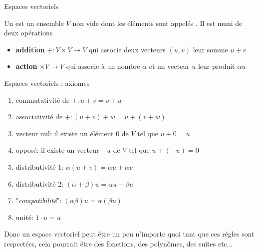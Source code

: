 \begin{parag}{Espaces vectoriels}
    \begin{definition}
        Un  est un ensemble $V$ non vide dont les éléments sont appelés . Il est muni de deux opérations
        \begin{itemize}
            \item \textbf{addition} $+ : V \times V \to V$ qui associe deux vecteurs $(u, v)$ leur somme $u + v$
            \item \textbf{action} \R$ \times V \to V$ qui associe à un nombre $\alpha$ et un vecteur $u$ leur produit $\alpha u$
        \end{itemize}
    \end{definition}
    \begin{subparag}{Espaces vectoriels : axiomes}
        \begin{enumerate}
            \item commutativité de $+ : u + v = v + u$
            \item associativité de $+ : (u+v) + w = u + (v + w)$
            \item vecteur nul: il existe un élément $0$ de $V$ tel que $u  +0 = u$
            \item opposé: il existe un vecteur $-u$ de $V$ tel que $u + (-u) = 0$
            \item distributivité 1: $\alpha(u + v) = \alpha u + \alpha v$
            \item distributivité 2: $(\alpha + \beta) u = \alpha u + \beta u$
            \item "\textit{compatibilité}": $(\alpha\beta)u = \alpha(\beta u)$
            \item unité: $1 \cdot u = u$
        \end{enumerate}
    \end{subparag}
    \begin{framedremark}
        Donc un espace vectoriel peut être un peu n'importe quoi tant que ces règles sont respectées, cela pourrait être des fonctions, des polynômes, des suites etc...
    \end{framedremark}
\end{parag}